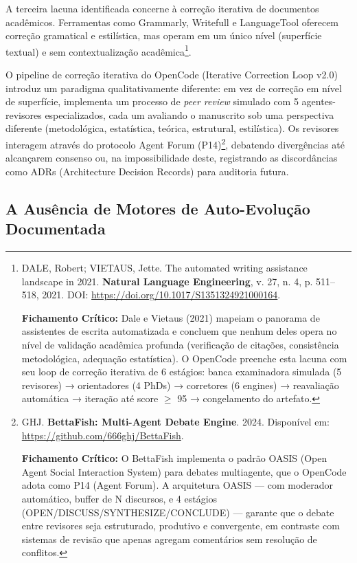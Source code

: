 A terceira lacuna identificada concerne à correção iterativa de documentos acadêmicos. Ferramentas como Grammarly, Writefull e LanguageTool oferecem correção gramatical e estilística, mas operam em um único nível (superfície textual) e sem contextualização acadêmica\footnote{
  DALE, Robert; VIETAUS, Jette. The automated writing assistance landscape in 2021. \textbf{Natural Language Engineering}, v. 27, n. 4, p. 511--518, 2021. DOI: \url{https://doi.org/10.1017/S1351324921000164}.

  \textbf{Fichamento Crítico:} Dale e Vietaus (2021) mapeiam o panorama de assistentes de escrita automatizada e concluem que nenhum deles opera no nível de validação acadêmica profunda (verificação de citações, consistência metodológica, adequação estatística). O OpenCode preenche esta lacuna com seu loop de correção iterativa de 6 estágios: banca examinadora simulada (5 revisores) → orientadores (4 PhDs) → corretores (6 engines) → reavaliação automática → iteração até score $\ge$ 95 → congelamento do artefato.
}.

O pipeline de correção iterativa do OpenCode (Iterative Correction Loop v2.0) introduz um paradigma qualitativamente diferente: em vez de correção em nível de superfície, implementa um processo de \textit{peer review} simulado com 5 agentes-revisores especializados, cada um avaliando o manuscrito sob uma perspectiva diferente (metodológica, estatística, teórica, estrutural, estilística). Os revisores interagem através do protocolo Agent Forum (P14)\footnote{
  GHJ. \textbf{BettaFish: Multi-Agent Debate Engine}. 2024. Disponível em: \url{https://github.com/666ghj/BettaFish}.

  \textbf{Fichamento Crítico:} O BettaFish implementa o padrão OASIS (Open Agent Social Interaction System) para debates multiagente, que o OpenCode adota como P14 (Agent Forum). A arquitetura OASIS --- com moderador automático, buffer de N discursos, e 4 estágios (OPEN/DISCUSS/SYNTHESIZE/CONCLUDE) --- garante que o debate entre revisores seja estruturado, produtivo e convergente, em contraste com sistemas de revisão que apenas agregam comentários sem resolução de conflitos.
}, debatendo divergências até alcançarem consenso ou, na impossibilidade deste, registrando as discordâncias como ADRs (Architecture Decision Records) para auditoria futura.

\subsection{A Ausência de Motores de Auto-Evolução Documentada}

